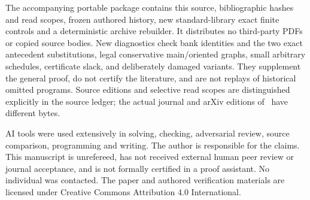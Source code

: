 \documentclass[11pt]{article}
\begin{document}
The accompanying portable package contains this source, bibliographic hashes
and read scopes, frozen authored history, new standard-library exact finite
controls and a deterministic archive rebuilder. It distributes no third-party
PDFs or copied source bodies. New diagnostics check bank identities and the
two exact antecedent substitutions, legal conservative main/oriented graphs,
small arbitrary schedules, certificate slack, and deliberately damaged
variants. They supplement the general proof, do not certify the literature,
and are not replays of historical omitted programs. Source editions and
selective read scopes are distinguished explicitly in the source ledger;
the actual journal and arXiv editions of~\cite{ACE} have different bytes.

AI tools were used extensively in solving, checking, adversarial review,
source comparison, programming and writing. The author is responsible for
the claims. This manuscript is unrefereed, has not received external human
peer review or journal acceptance, and is not formally certified in a proof
assistant. No individual was contacted. The paper and authored verification
materials are licensed under Creative Commons Attribution 4.0 International.
\end{document}
